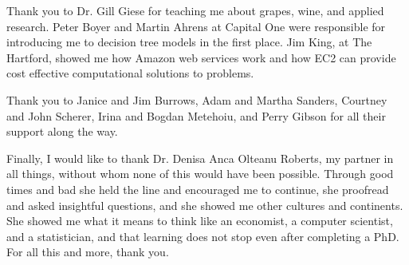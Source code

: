 \documentclass[12pt]{report}
\def\listofsymbols{ \clearpage}
\def\listofabbreviations{ \clearpage}
\begin{document}
Thank you to Dr. Gill Giese for teaching me about grapes, wine, and applied research. Peter Boyer and Martin Ahrens at Capital One were responsible for introducing me to decision tree models in the first place. Jim King, at The Hartford, showed me how Amazon web services work and how EC2 can provide cost effective computational solutions to problems. 

Thank you to Janice and Jim Burrows, Adam and Martha Sanders, Courtney and John Scherer, Irina and Bogdan Metehoiu, and Perry Gibson for all their support along the way. 

Finally, I would like to thank Dr. Denisa Anca Olteanu Roberts, my partner in all things, without whom none of this would have been possible. Through good times and bad she held the line and encouraged me to continue, she proofread and asked insightful questions, and she showed me other cultures and continents. She showed me what it means to think like an economist, a computer scientist, and a statistician, and that learning does not stop even after completing a PhD. For all this and more, thank you.  

\pagebreak
\tableofcontents
\pagebreak

\listoffigures
\pagebreak

\listoftables
\pagebreak

\clearpage
{}
\listofsymbols
\pagebreak

\clearpage
\listofabbreviations
\pagebreak

\cleardoublepage
{}










\newpage


\newpage

\newpage

\pagebreak



\pagebreak


%


\end{document}
